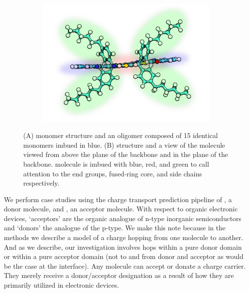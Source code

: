 \begin{figure}
\begin{subfigure}{.3\textwidth}
\end{subfigure}%
\begin{subfigure}{.3\textwidth}
    \centering
    \includegraphics[width=\textwidth]{figures/itic-sidechain-figure.png}
\end{subfigure}
    \caption[]{(A)  monomer structure and an oligomer
    composed of 15 identical monomers imbued in blue.
    (B)  structure  and a view of the molecule viewed from
    above the plane of the backbone and in the plane of the backbone. 
    molecule is imbued with blue, red, and green to call attention to the end groups, fused-ring core, and
    side chains respectively.}
\label{molecules}
\end{figure}

We perform case studies using the charge transport prediction pipeline of , a
donor molecule, and , an acceptor molecule. With respect to organic electronic devices, `acceptors' are the
organic analogue of n-type inorganic semiconductors and `donors' the analogue
of the p-type. We make this note because in the methods we describe a model of
a charge hopping from one molecule to another. And as we describe, our
investigation involves hops within a pure donor domain or within a pure
acceptor domain (not to and from donor and acceptor as would be the case at the interface). 
Any molecule can accept or donate a charge carrier.
They merely receive a donor/acceptor designation as a result of how they
are primarily utilized in electronic devices. 

